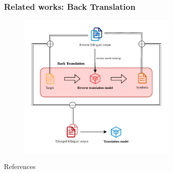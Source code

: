 \documentclass[]{beamer} %
\newcommand{\backupend}{
    \addtocounter{framenumberappendix}{-\value{framenumber}}
    \addtocounter{framenumber}{\value{framenumberappendix}} 
}
\begin{document}
\section{}
\frame
{\frametitle{Related works: Back Translation}

\begin{figure}
  \centering
  \includegraphics[width=0.7\textwidth, keepaspectratio]{figure/BT/backtranslation.pdf}
  \caption{\citep{sennrich-etal-2016-improving}}
\end{figure} 
 } 

\begin{frame}[allowframebreaks]{References}

\renewcommand{\bibname}{References}
\small



\end{frame}


\backupend
\end{document}
